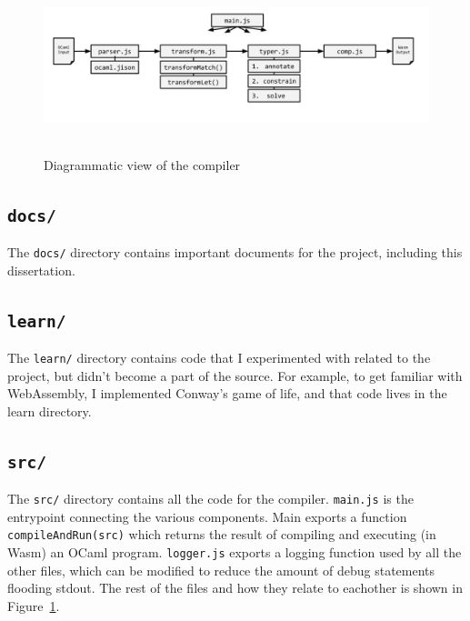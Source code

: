 \documentclass[12pt,a4paper,twoside,openright]{report}
\begin{document}
\begin{figure}[tbh]
\centerline{\includegraphics[height=2in]{pipeline}}
\caption{Diagrammatic view of the compiler}
\label{pipeline}
\end{figure}

\subsection*{{\tt docs/}}
The {\tt docs/} directory contains important documents for the project, including this dissertation.

\subsection*{{\tt learn/}}
The {\tt learn/} directory contains code that I experimented with related to the project, but didn't become a part of the source.
For example, to get familiar with WebAssembly, I implemented Conway's game of life, and that code lives in the learn directory.

\subsection*{{\tt src/}}
The {\tt src/} directory contains all the code for the compiler.
{\tt main.js} is the entrypoint connecting the various components. Main exports a function {\tt compileAndRun(src)} which returns the result of compiling and executing (in Wasm) an OCaml program.
{\tt logger.js} exports a logging function used by all the other files, which can be modified to reduce the amount of debug statements flooding stdout.
The rest of the files and how they relate to eachother is shown in Figure~\ref{pipeline}.
\end{document}
